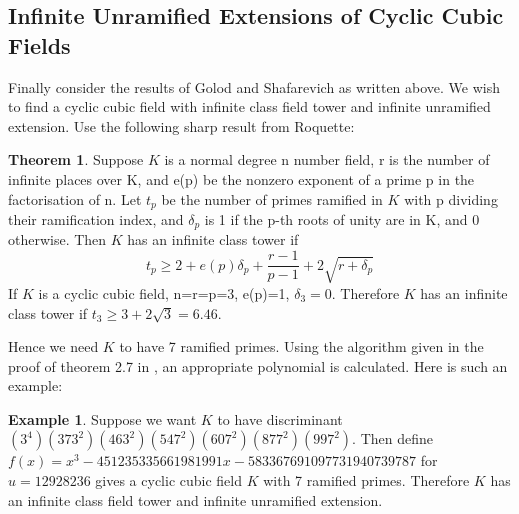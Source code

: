 \documentclass[12pt]{extarticle}
\newcommand{\<}{\langle}
\renewcommand{\>}{\rangle}
\theoremstyle{definition}
\newtheorem{theorem}{Theorem}
\newtheorem*{example}{Example}
\begin{document}
\subsection{Infinite Unramified Extensions of Cyclic Cubic Fields }
Finally consider the results of Golod and Shafarevich as written above. We wish to find a cyclic cubic field with infinite class field tower and infinite unramified extension. Use the following sharp result from Roquette:
\begin{theorem}
    Suppose $K$ is a normal degree n number field, r is the number of infinite places over K, and e(p) be the nonzero exponent of a prime p in the factorisation of n. Let $t_p$ be the number of primes ramified in $K$ with p dividing their ramification index, and $\delta_p$ is 1 if the p-th roots of unity are in K, and 0 otherwise. Then $K$ has an infinite class tower if \begin{equation}
        t_p\geqslant 2 + e(p)\delta_p + \frac{r-1}{p-1} + 2 \sqrt{r+\delta_p}
    \end{equation}
 If $K$ is a cyclic cubic field,  n=r=p=3, e(p)=1, $\delta_3 = 0$. Therefore $K$ has an infinite class tower if $t_3 \geq 3 + 2\sqrt{3} = 6.46$. 
\end{theorem}
Hence we need $K$ to have 7 ramified primes. Using the algorithm given in the proof of theorem 2.7 in \cite{WONG}, an appropriate polynomial is calculated. Here is such an example:
\begin{example}
    Suppose we want $K$ to have discriminant $(3^4)(373^2)(463^2)(547^2)(607^2)(877^2)(997^2)$. Then define $f(x) = x^3 -451235335661981991x-583367691097731940739787$ for $u=12928236$ gives a cyclic cubic field $K$ with 7 ramified primes. Therefore $K$ has an infinite class field tower and infinite unramified extension. 
\end{example}
\end{document}
